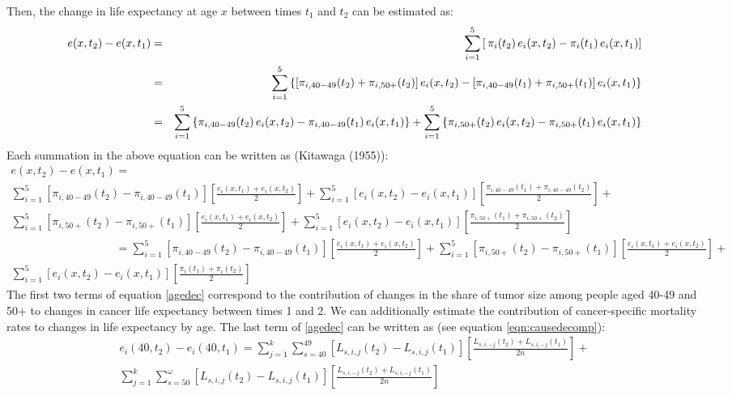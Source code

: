\documentclass[twoside]{article}
\begin{document}
Then, the change in life expectancy at age $x$ between times $t_1$ and $t_2$ can be estimated as:
{\footnotesize
\begin{eqnarray}
  e(x,t_2)-e(x,t_1)&=&\sum_{i=1}^{5}\left[\,\pi_i(t_2)\,e_i(x,t_2)- \pi_i(t_1)\,e_i(x,t_1)\right] \notag\\
  &=& \sum_{i=1}^{5}\left\{[\pi_{i,40-49}(t_2)+\pi_{i,50+}(t_2)]\,e_i(x,t_2)- [\pi_{i,40-49}(t_1)+\pi_{i,50+}(t_1)]\,e_i(x,t_1)\right\}\notag \\
  &=&\sum_{i=1}^{5}\left\{\pi_{i,40-49}(t_2)\,e_i(x,t_2)- \pi_{i,40-49}(t_1)\,e_i(x,t_1)\right\} + \sum_{i=1}^{5}\left\{\pi_{i,50+}(t_2)\,e_i(x,t_2)- \pi_{i,50+}(t_1)\,e_i(x,t_1)\right\} \notag 
  \label{eqn:basic}
\end{eqnarray}
}
Each summation in the above equation can be written as (Kitawaga (1955)):
\begin{multline}
e(x,t_2)-e(x,t_1)= \\
\sum_{i=1}^{5}\left[\pi_{i,40-49}(t_2)-\pi_{i,40-49}(t_1) \right]\left[\frac{e_i(x,t_1)+e_i(x,t_2)}{2}\right]+\sum_{i=1}^{5}\left[e_i(x,t_2)-e_i(x,t_1) \right]\left[\frac{\pi_{i,40-49}(t_1)+\pi_{i,40-49}(t_2)}{2}\right] +\\
\sum_{i=1}^{5}\left[\pi_{i,50+}(t_2)-\pi_{i,50+}(t_1) \right]\left[\frac{e_i(x,t_1)+e_i(x,t_2)}{2}\right]+\sum_{i=1}^{5}\left[e_i(x,t_2)-e_i(x,t_1) \right]\left[\frac{\pi_{i,50+}(t_1)+\pi_{i,50+}(t_2)}{2}\right] \\
\phantom{e(x,t_2)-e(x,t_1)}= \sum_{i=1}^{5}\left[\pi_{i,40-49}(t_2)-\pi_{i,40-49}(t_1) \right]\left[\frac{e_i(x,t_1)+e_i(x,t_2)}{2}\right] + 
\sum_{i=1}^{5}\left[\pi_{i,50+}(t_2)-\pi_{i,50+}(t_1) \right]\left[\frac{e_i(x,t_1)+e_i(x,t_2)}{2}\right] + \\
\sum_{i=1}^{5}\left[e_i(x,t_2)-e_i(x,t_1) \right]\left[\frac{\pi_i(t_1)+\pi_i(t_2)}{2}\right]
\label{agedec}
\end{multline}
The first two terms of equation \eqref{agedec} correspond to the contribution of changes in the share of tumor size among people aged 40-49 and 50+ to changes in cancer life expectancy between times 1 and 2. We can additionally estimate the contribution of cancer-specific mortality rates to changes in life expectancy by age. The last term of \eqref{agedec} can be written as (see equation \eqref{eqn:causedecomp}):
\begin{multline}
e_i(40,t_2)-e_i(40,t_1)=\sum_{j=1}^{k} \sum_{s=40}^{49}\left[L_{s,i,j}(t_2)-L_{s,i,j}(t_1) \right] \left[\frac{L_{s,i,-j}(t_2)+L_{s,i,-j}(t_1) }{2n} \right] + \\
\sum_{j=1}^{k} \sum_{s=50}^{\omega}\left[L_{s,i,j}(t_2)-L_{s,i,j}(t_1) \right] \left[\frac{L_{s,i,-j}(t_2)+L_{s,i,-j}(t_1) }{2n} \right]
\end{multline}
\end{document}
